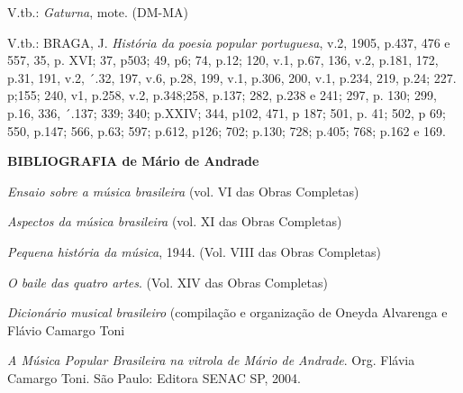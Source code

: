 V.tb.: \emph{Gaturna}, mote. (DM-MA)

V.tb.: BRAGA, J. \emph{História da poesia popular portuguesa}, v.2,
1905, p.437, 476 e 557, 35, p. XVI; 37, p503; 49, p6; 74, p.12; 120,
v.1, p.67, 136, v.2, p.181, 172, p.31, 191, v.2, ´.32, 197, v.6, p.28,
199, v.1, p.306, 200, v.1, p.234, 219, p.24; 227. p;155; 240, v1, p.258,
v.2, p.348;258, p.137; 282, p.238 e 241; 297, p. 130; 299, p.16, 336,
´.137; 339; 340; p.XXIV; 344, p102, 471, p 187; 501, p. 41; 502, p 69;
550, p.147; 566, p.63; 597; p.612, p126; 702; p.130; 728; p.405; 768;
p.162 e 169.

\textbf{BIBLIOGRAFIA de Mário de Andrade}

\emph{Ensaio sobre a música brasileira} (vol. VI das Obras Completas)

\emph{Aspectos da música brasileira} (vol. XI das Obras Completas)

\emph{Pequena história da música}, 1944. (Vol. VIII das Obras Completas)

\emph{O baile das quatro artes}. (Vol. XIV das Obras Completas)

\emph{Dicionário musical brasileiro} (compilação e organização de Oneyda
Alvarenga e Flávio Camargo Toni

\emph{A Música Popular Brasileira na vitrola de Mário de Andrade}. Org.
Flávia Camargo Toni. São Paulo: Editora SENAC SP, 2004.
